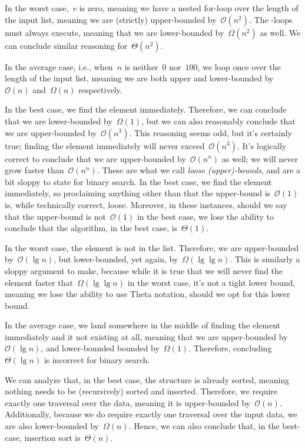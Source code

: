 In the worst case,~$v$ is zero, meaning we have a nested for-loop over the length of the input list, meaning we are (strictly) upper-bounded by~$\mathcal{O}(n^2)$. 
The -loops must always execute, meaning that we are lower-bounded by~$\Omega(n^2)$ as well. 
We can conclude similar reasoning for~$\Theta(n^2)$.

In the average case, i.e., when~$n$ is neither~$0$ nor~$100$, we loop once over the length of the input list, meaning we are both upper and lower-bounded by~$\mathcal{O}(n)$ and~$\Omega(n)$ respectively.

In the best case, we find the element immediately. 
Therefore, we can conclude that we are lower-bounded by~$\Omega(1)$, but we can also reasonably conclude that we are upper-bounded by~$\mathcal{O}(n^3)$. 
This reasoning seems odd, but it's certainly true; finding the element immediately will never exceed~$\mathcal{O}(n^3)$. 
It's logically correct to conclude that we are upper-bounded by~$\mathcal{O}(n^n)$ as well; we will never grow faster than~$\mathcal{O}(n^n)$. 
These are what we call \emph{loose (upper)-bounds}, and are a bit sloppy to state for binary search. 
In the best case, we find the element immediately, so proclaiming anything other than that the upper-bound is~$\mathcal{O}(1)$ is, while technically correct, loose. 
Moreover, in these instances, should we say that the upper-bound is not~$\mathcal{O}(1)$ in the best case, we lose the ability to conclude that the algorithm, in the best case, is~$\Theta(1)$.

In the worst case, the element is not in the list. 
Therefore, we are upper-bounded by~$\mathcal{O}(\lg{n})$, but lower-bounded, yet again, by~$\Omega(\lg\lg{n})$. 
This is similarly a sloppy argument to make, because while it is true that we will never find the element faster that~$\Omega(\lg\lg{n})$ in the worst case, it's not a tight lower bound, meaning we lose the ability to use Theta notation, should we opt for this lower bound.

In the average case, we land somewhere in the middle of finding the element immediately and it not existing at all, meaning that we are upper-bounded by~$\mathcal{O}(\lg{n})$, and lower-bounded bounded by~$\Omega(1)$. 
Therefore, concluding~$\Theta(\lg{n})$ is incorrect for binary search.

We can analyze that, in the best case, the structure is already sorted, meaning nothing needs to be (recursively) sorted and inserted. 
Therefore, we require exactly one traversal over the data, meaning it is upper-bounded by~$\mathcal{O}(n)$. 
Additionally, because we do require exactly one traversal over the input data, we are also lower-bounded by~$\Omega(n)$. 
Hence, we can also conclude that, in the best-case, insertion sort is~$\Theta(n)$.

